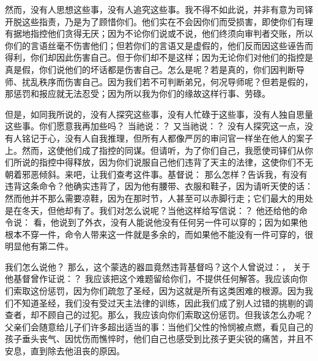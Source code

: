 然而，没有人思想这些事，没有人追究这些事。我不得不如此说，并非有意为司铎开脱这些指责，乃是为了顾惜你们。他们实在不会因你们而受损害，即使你们有理有据地指控他们贪得无厌；因为不论你们说或不说，他们终须向审判者交账，所以你们的言语丝毫不伤害他们；但若你们的言语又是虚假的，他们反而因这些诬告而得利，你们却因此伤害自己。但于你们却不是这样；因为无论你们对他们的指控是真是假，你们说他们的坏话都是伤害自己。怎么是呢？若是真的，你们因判断导师、扰乱秩序而伤害自己。因为我们若不可判断弟兄，何况导师呢？但若是假的，那惩罚和报应就无法忍受；因为所以我为你们的缘故这样行事、劳碌。\par

但是，如同我所说的，没有人探究这些事，没有人忙碌于这些事，没有人独自思量这些事。你们愿意我再加些吗？  当祂说：？  又当祂说：？  没有人探究这一点，没有人铭记于心，没有人自我推理，但所有人都像严厉的审问官一样坐在他人的案子上。然而，这使他们成了指控的同谋。但请听，为了你们自己，我愿使司铎们从你们所说的指控中得释放，因为你们说服自己他们违背了天主的法律，这使你们不无朝着邪恶倾斜。来吧，让我们查考这件事。基督说：  那么怎样？告诉我，有没有违背这条命令？他确实违背了，因为他有腰带、衣服和鞋子，因为请听天使的话：  然而他并不那么需要凉鞋，因为在那时节，人甚至可以赤脚行走；它们最大的用处是在冬天，但他却有了。我们对怎么说呢？当他这样给写信说：？  他还给他的命令说：  看，他说到了外衣，没有人能说他没有任何另一件可以穿的；因为如果他根本不穿一件，命令人带来这一件就是多余的，而如果他不能没有一件可穿的，很明显他有第二件。\par

我们怎么说他？  那么，这个蒙选的器皿竟然违背基督吗？这个人曾说过：，  关于他基督曾作证说：？  我应该把这个难题留给你们，不提供任何解答。我应该向你们索取这份惩罚，因为你们疏忽了圣经，因为这就是所有这类困难的根源。因为我们不知道圣经，我们没有受过天主法律的训练，因此我们成了别人过错的挑剔的调查者，却不顾自己的过犯。那么，我应该向你们索取这份惩罚。但我该怎么办呢？父亲们会随意给儿子们许多超出适当的事：当他们父性的怜悯被点燃，看见自己的孩子垂头丧气、因忧伤而憔悴时，他们自己也感受到比孩子更尖锐的痛苦，并且不安息，直到除去他沮丧的原因。\par

